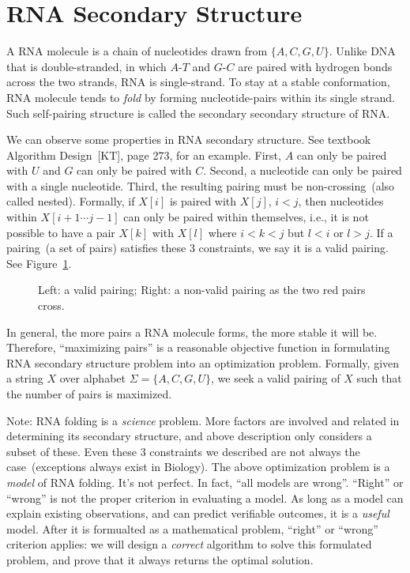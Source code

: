 \setcounter{definition}{0} \setcounter{property}{0} \setcounter{claim}{0} \setcounter{fact}{0} \setcounter{corollary}{0} \setcounter{figure}{0}
\section{RNA Secondary Structure}

A RNA molecule is a chain of nucleotides drawn from $\{A,C,G,U\}$.
Unlike DNA that is double-stranded, in which $A$-$T$ and $G$-$C$ are paired
with hydrogen bonds across the two strands, RNA is single-strand.
To stay at a stable conformation, RNA molecule tends to \emph{fold}
by forming nucleotide-pairs within its single strand.
Such self-pairing structure is called the secondary secondary structure of RNA.

We can observe some properties in RNA secondary structure.
See textbook Algorithm Design~[KT], page 273, for an example.
First, $A$ can only be paired with $U$ and $G$ can only be paired with $C$.
Second, a nucleotide can only be paired with a single nucleotide.
Third, the resulting pairing must be non-crossing~(also called nested).
Formally, if $X[i]$ is paired with $X[j]$, $i < j$, then
nucleotides within $X[i + 1 \cdots j - 1]$ can only be paired within themselves,
i.e., it is not possible to have a pair $X[k]$ with $X[l]$ where $i < k < j$ but $l < i$ or $l > j$.
If a pairing~(a set of pairs) satisfies these 3 constraints, we say it is a valid pairing.
See Figure~\ref{fig:nested}.

\begin{figure}[h]
\centering{}
\caption{Left: a valid pairing; Right: a non-valid pairing as the two red pairs cross.}
\label{fig:nested}
\end{figure}

In general, the more pairs a RNA molecule forms, the more stable it will be.
Therefore, ``maximizing pairs'' is a reasonable objective function
in formulating RNA secondary structure problem into an optimization problem.
Formally, given a string $X$ over alphabet $\Sigma = \{A, C, G, U\}$,
we seek a valid pairing of $X$ such that the number of pairs is maximized.

Note: RNA folding is a \emph{science} problem. More factors
are involved and related in
determining its secondary structure, and above description only considers
a subset of these. Even these 3 constraints we described are not always
the case~(exceptions always exist in Biology). The above optimization problem
is a \emph{model} of RNA folding. It's not perfect. In fact, ``all models are wrong''.
``Right'' or ``wrong'' is not the proper criterion in evaluating a model.
As long as a model can explain existing observations, and can predict verifiable outcomes,
it is a \emph{useful} model. After it is formualted as a mathematical problem,
``right'' or ``wrong'' criterion applies: we will design a \emph{correct} algorithm
to solve this formulated problem, and prove that it always returns the optimal solution.

